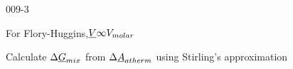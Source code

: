 \begin{mitframe}{009-3}
\begin{listone}
\begin{listtwo}
\begin{listthree}
        	\item For Flory-Huggins,$\uline{\vol}\infty\vol_{molar}$

		\end{listthree}
         
    \end{listtwo}
    
    \item Calculate $\iipf\uline{\gibbs}_{\mixfunc}$ from $\iipf\uline{\helmholtz}_{\atfunc}$ using Stirling's approximation
    
    \begin{listtwo}
    	
        \item 
    
    \end{listtwo}
    
\end{listone}			

\end{mitframe}